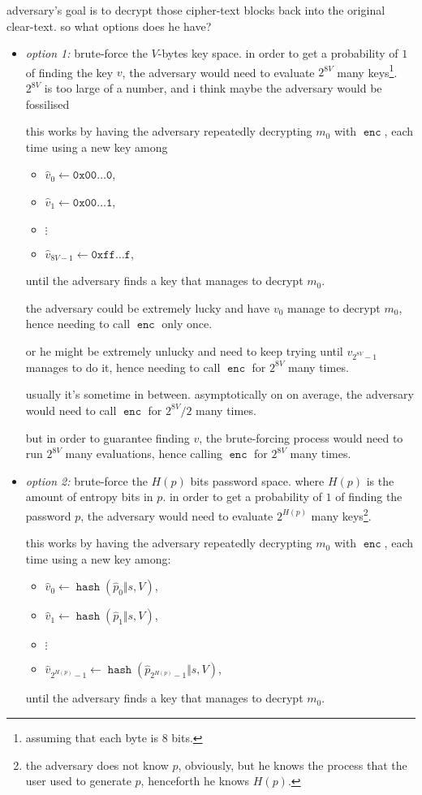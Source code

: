 \documentclass[twocolumn]{article}
\DeclareMathOperator{\enc}{\texttt{enc}}
\DeclareMathOperator{\hash}{\texttt{hash}}
\begin{document}
adversary's goal is to decrypt those cipher-text blocks back into the
original clear-text.  so what options does he have?
\begin{itemize}
    \item \emph{option 1:} brute-force the $V$-bytes key space.  in order
    to get a probability of $1$ of finding the key $v$, the adversary would
    need to evaluate $2^{8V}$ many keys\footnote{assuming that each
    byte is $8$ bits.}.  $2^{8V}$ is too large of a number, and i think
    maybe the adversary would be fossilised 

    this works by having the adversary repeatedly decrypting $m_0$ with
    $\enc$, each time using a new key among
    \begin{itemize}
        \item $\hat v_0 \gets \texttt{0x00\ldots 0}$,
        \item $\hat v_1 \gets \texttt{0x00\ldots 1}$,
        \item $\vdots$
        \item $\hat v_{8V-1} \gets \texttt{0xff\ldots f}$,
    \end{itemize}
    until the adversary finds a key that manages to decrypt $m_0$.

    the adversary could be extremely lucky and have $v_0$ manage to decrypt
    $m_0$, hence needing to call $\enc$ only once.  

    or he might be extremely unlucky and need to keep trying until
    $v_{2^{8V}-1}$ manages to do it, hence needing to call $\enc$ for
    $2^{8V}$ many times.

    usually it's sometime in between.  asymptotically on on average, the
    adversary would need to call $\enc$ for $2^{8V}/2$ many times.

    but in order to guarantee finding $v$, the brute-forcing process would
    need to run $2^{8V}$ many evaluations, hence calling $\enc$ for
    $2^{8V}$ many times.

    \item \emph{option 2:} brute-force the $H(p)$ bits password space.
    where $H(p)$ is the amount of entropy bits in $p$.  in order to get a
    probability of $1$ of finding the password $p$, the adversary would
    need to evaluate $2^{H(p)}$ many keys\footnote{the adversary does not
    know $p$, obviously, but he knows the process that the user used to
    generate $p$, henceforth he knows $H(p)$.}.

    this works by having the adversary repeatedly decrypting $m_0$ with
    $\enc$, each time using a new key among:
    \begin{itemize}
        \item $\hat v_0 \gets \hash(\hat p_0 \Vert s, V)$,
        \item $\hat v_1 \gets \hash(\hat p_1 \Vert s, V)$,
        \item $\vdots$
        \item $\hat v_{2^{H(p)}-1} \gets \hash(\hat p_{2^{H(p)}-1} \Vert s,
        V)$,
    \end{itemize}
    until the adversary finds a key that manages to decrypt $m_0$.


\end{itemize}
\end{document}
